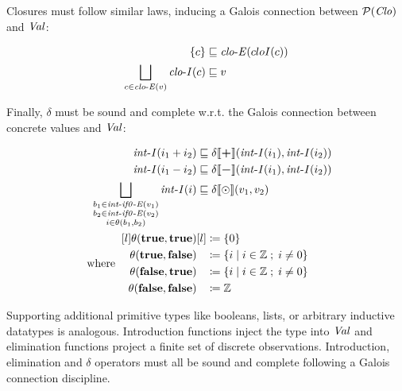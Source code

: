 Closures must follow similar laws, inducing a Galois connection between
$ \mathcal{P}  (\operatorname{\mathit{Clo}}) $ and $ \operatorname{\mathit{Val}} $:

\small\begin{alignat*}{2}
 \{ c \}  &  \sqsubseteq   \operatorname{\mathit{clo-E}}( cloI(c)) \\
 \bigsqcup  _{\substack{ c  \in   \operatorname{\mathit{clo-E}}( v) }}   \operatorname{\mathit{clo-I}}( c) &  \sqsubseteq  v
\end{alignat*}\normalsize

Finally, $ \delta $ must be sound and complete w.r.t. the Galois
connection between concrete values and $ \operatorname{\mathit{Val}} $:

\small\begin{alignat*}{2}
 \itop{int-I}( i _1  + i _2 ) &  \sqsubseteq   \delta  \llbracket  \keywordop{+}  \rrbracket  (\itop{int-I}( i _1 ) ,\itop{int-I}( i _2 )) \\
 \itop{int-I}( i _1  - i _2 ) &  \sqsubseteq   \delta  \llbracket  \keywordop{-}  \rrbracket  (\itop{int-I}( i _1 ) ,\itop{int-I}( i _2 )) \\
 \bigsqcup  _{\substack{ b _1   \in   \itop{int-if0-E}( v _1 )  \\  b _2   \in   \itop{int-if0-E}( v _2 )  \\  i  \in   \theta (b _1 ,b _2 ) }}   \itop{int-I}( i) &  \sqsubseteq   \delta  \llbracket  \odot  \rrbracket (v _1 ,v _2 ) \\
 \;\;\text{where}\;\;   \begin{aligned}[l]   \theta (  \ttbfop{true}  ,  \ttbfop{true}  )  \\   \theta (  \ttbfop{true}  ,  \ttbfop{false}  )  \\   \theta (  \ttbfop{false}  ,  \ttbfop{true}  )  \\   \theta (  \ttbfop{false}  ,  \ttbfop{false}  )  \end{aligned}  &  \begin{aligned}[l]  &  \coloneqq   \{ 0 \}   \\  &  \coloneqq   \{ i  \;|\;  i  \in   \mathbb{Z}   \;;\;  i  \neq  0  \}   \\  &  \coloneqq   \{ i  \;|\;  i  \in   \mathbb{Z}   \;;\;  i  \neq  0 \}   \\  &  \coloneqq   \mathbb{Z}   \end{aligned} 
\end{alignat*}\normalsize

\par

Supporting additional primitive types like booleans, lists, or arbitrary
inductive datatypes is analogous. Introduction functions inject the type
into $ \operatorname{\mathit{Val}} $ and elimination functions project a finite set of
discrete observations. Introduction, elimination and $ \delta $
operators must all be sound and complete following a Galois connection
discipline.

